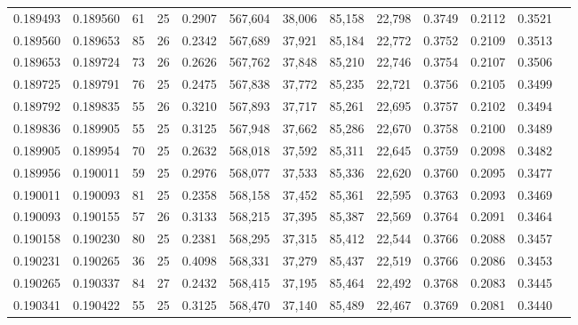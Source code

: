 \begin{tabular}{rrrrrrrrrrrrr}
0.189493 & 0.189560 &  61 &  25 &                                     0.2907 & 567,604 &  38,006 &  85,158 &  22,798 & 0.3749 & 0.2112 & 0.3521 \\
0.189560 & 0.189653 &  85 &  26 &                                     0.2342 & 567,689 &  37,921 &  85,184 &  22,772 & 0.3752 & 0.2109 & 0.3513 \\
0.189653 & 0.189724 &  73 &  26 &                                     0.2626 & 567,762 &  37,848 &  85,210 &  22,746 & 0.3754 & 0.2107 & 0.3506 \\
0.189725 & 0.189791 &  76 &  25 &                                     0.2475 & 567,838 &  37,772 &  85,235 &  22,721 & 0.3756 & 0.2105 & 0.3499 \\
0.189792 & 0.189835 &  55 &  26 &                                     0.3210 & 567,893 &  37,717 &  85,261 &  22,695 & 0.3757 & 0.2102 & 0.3494 \\
0.189836 & 0.189905 &  55 &  25 &                                     0.3125 & 567,948 &  37,662 &  85,286 &  22,670 & 0.3758 & 0.2100 & 0.3489 \\
0.189905 & 0.189954 &  70 &  25 &                                     0.2632 & 568,018 &  37,592 &  85,311 &  22,645 & 0.3759 & 0.2098 & 0.3482 \\
0.189956 & 0.190011 &  59 &  25 &                                     0.2976 & 568,077 &  37,533 &  85,336 &  22,620 & 0.3760 & 0.2095 & 0.3477 \\
0.190011 & 0.190093 &  81 &  25 &                                     0.2358 & 568,158 &  37,452 &  85,361 &  22,595 & 0.3763 & 0.2093 & 0.3469 \\
0.190093 & 0.190155 &  57 &  26 &                                     0.3133 & 568,215 &  37,395 &  85,387 &  22,569 & 0.3764 & 0.2091 & 0.3464 \\
0.190158 & 0.190230 &  80 &  25 &                                     0.2381 & 568,295 &  37,315 &  85,412 &  22,544 & 0.3766 & 0.2088 & 0.3457 \\
0.190231 & 0.190265 &  36 &  25 &                                     0.4098 & 568,331 &  37,279 &  85,437 &  22,519 & 0.3766 & 0.2086 & 0.3453 \\
0.190265 & 0.190337 &  84 &  27 &                                     0.2432 & 568,415 &  37,195 &  85,464 &  22,492 & 0.3768 & 0.2083 & 0.3445 \\
0.190341 & 0.190422 &  55 &  25 &                                     0.3125 & 568,470 &  37,140 &  85,489 &  22,467 & 0.3769 & 0.2081 & 0.3440 \\

\end{tabular}
